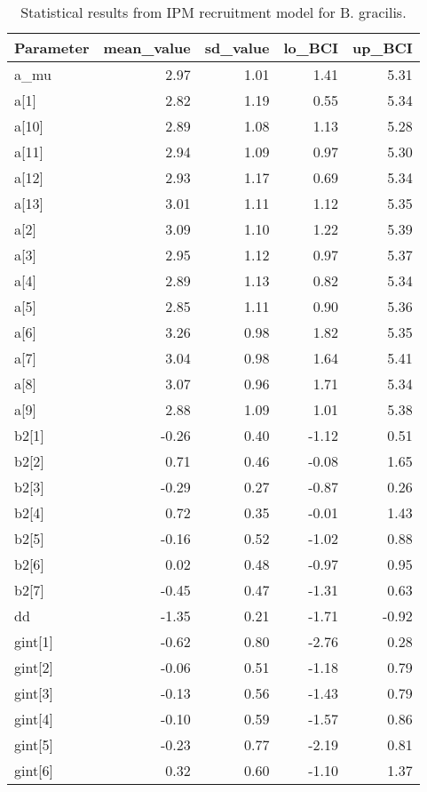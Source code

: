 \documentclass[12pt,]{article}
\begin{document}
\begin{table}[ht]
\centering
\caption{Statistical results from IPM recruitment model for B. gracilis.} 
{\footnotesize
\begin{tabular}{lrrrr}
  \hline
Parameter & mean\_value & sd\_value & lo\_BCI & up\_BCI \\ 
  \hline
a\_mu & 2.97 & 1.01 & 1.41 & 5.31 \\ 
  a[1] & 2.82 & 1.19 & 0.55 & 5.34 \\ 
  a[10] & 2.89 & 1.08 & 1.13 & 5.28 \\ 
  a[11] & 2.94 & 1.09 & 0.97 & 5.30 \\ 
  a[12] & 2.93 & 1.17 & 0.69 & 5.34 \\ 
  a[13] & 3.01 & 1.11 & 1.12 & 5.35 \\ 
  a[2] & 3.09 & 1.10 & 1.22 & 5.39 \\ 
  a[3] & 2.95 & 1.12 & 0.97 & 5.37 \\ 
  a[4] & 2.89 & 1.13 & 0.82 & 5.34 \\ 
  a[5] & 2.85 & 1.11 & 0.90 & 5.36 \\ 
  a[6] & 3.26 & 0.98 & 1.82 & 5.35 \\ 
  a[7] & 3.04 & 0.98 & 1.64 & 5.41 \\ 
  a[8] & 3.07 & 0.96 & 1.71 & 5.34 \\ 
  a[9] & 2.88 & 1.09 & 1.01 & 5.38 \\ 
  b2[1] & -0.26 & 0.40 & -1.12 & 0.51 \\ 
  b2[2] & 0.71 & 0.46 & -0.08 & 1.65 \\ 
  b2[3] & -0.29 & 0.27 & -0.87 & 0.26 \\ 
  b2[4] & 0.72 & 0.35 & -0.01 & 1.43 \\ 
  b2[5] & -0.16 & 0.52 & -1.02 & 0.88 \\ 
  b2[6] & 0.02 & 0.48 & -0.97 & 0.95 \\ 
  b2[7] & -0.45 & 0.47 & -1.31 & 0.63 \\ 
  dd & -1.35 & 0.21 & -1.71 & -0.92 \\ 
  gint[1] & -0.62 & 0.80 & -2.76 & 0.28 \\ 
  gint[2] & -0.06 & 0.51 & -1.18 & 0.79 \\ 
  gint[3] & -0.13 & 0.56 & -1.43 & 0.79 \\ 
  gint[4] & -0.10 & 0.59 & -1.57 & 0.86 \\ 
  gint[5] & -0.23 & 0.77 & -2.19 & 0.81 \\ 
  gint[6] & 0.32 & 0.60 & -1.10 & 1.37 \\ 

\end{tabular}}
\end{table}
\end{document}
